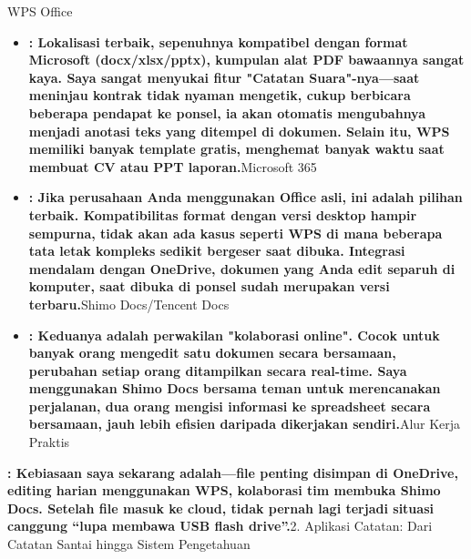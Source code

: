 


WPS Office

\begin{itemize}
  \item \textbf{: Lokalisasi terbaik, sepenuhnya kompatibel dengan format Microsoft (docx/xlsx/pptx), kumpulan alat PDF bawaannya sangat kaya. Saya sangat menyukai fitur "Catatan Suara"-nya—saat meninjau kontrak tidak nyaman mengetik, cukup berbicara beberapa pendapat ke ponsel, ia akan otomatis mengubahnya menjadi anotasi teks yang ditempel di dokumen. Selain itu, WPS memiliki banyak template gratis, menghemat banyak waktu saat membuat CV atau PPT laporan.}Microsoft 365
  \item \textbf{: Jika perusahaan Anda menggunakan Office asli, ini adalah pilihan terbaik. Kompatibilitas format dengan versi desktop hampir sempurna, tidak akan ada kasus seperti WPS di mana beberapa tata letak kompleks sedikit bergeser saat dibuka. Integrasi mendalam dengan OneDrive, dokumen yang Anda edit separuh di komputer, saat dibuka di ponsel sudah merupakan versi terbaru.}Shimo Docs/Tencent Docs
  \item \textbf{: Keduanya adalah perwakilan "kolaborasi online". Cocok untuk banyak orang mengedit satu dokumen secara bersamaan, perubahan setiap orang ditampilkan secara real-time. Saya menggunakan Shimo Docs bersama teman untuk merencanakan perjalanan, dua orang mengisi informasi ke spreadsheet secara bersamaan, jauh lebih efisien daripada dikerjakan sendiri.}Alur Kerja Praktis
\end{itemize}

\textbf{: Kebiasaan saya sekarang adalah—file penting disimpan di OneDrive, editing harian menggunakan WPS, kolaborasi tim membuka Shimo Docs. Setelah file masuk ke cloud, tidak pernah lagi terjadi situasi canggung “lupa membawa USB flash drive”.}2. Aplikasi Catatan: Dari Catatan Santai hingga Sistem Pengetahuan


